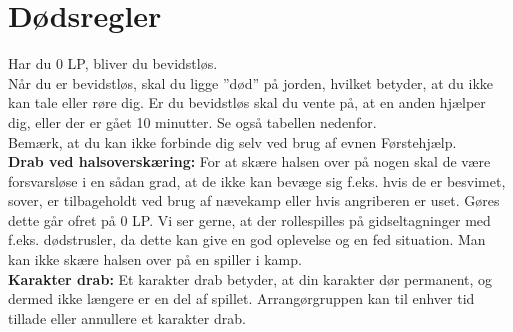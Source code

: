 \section*{Dødsregler}
Har du 0 LP, bliver du bevidstløs.\\
Når du er bevidstløs, skal du ligge ”død” på jorden, hvilket betyder, at du ikke kan tale eller røre dig. Er du bevidstløs skal du vente på, at en anden hjælper dig, eller der er gået 10 minutter. Se også tabellen nedenfor.\\
Bemærk, at du kan ikke forbinde dig selv ved brug af evnen Førstehjælp.\\
\textbf{Drab ved halsoverskæring:} For at skære halsen over på nogen skal de være forsvarsløse i en sådan grad, at de ikke kan bevæge sig f.eks. hvis de er besvimet, sover, er tilbageholdt ved brug af nævekamp eller hvis angriberen er uset. Gøres dette går ofret på 0 LP.
Vi ser gerne, at der rollespilles på gidseltagninger med f.eks. dødstrusler, da dette kan give en god oplevelse og en fed situation.
Man kan ikke skære halsen over på en spiller i kamp.\\
\textbf{Karakter drab:} Et karakter drab betyder, at din karakter dør permanent, og dermed ikke længere er en del af spillet. Arrangørgruppen kan til enhver tid tillade eller annullere et karakter drab.
